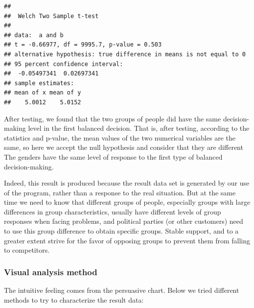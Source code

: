\documentclass[
]{article}
\newenvironment{Shaded}{\begin{snugshade}}{\end{snugshade}}
\newcommand{\KeywordTok}[1]{\textcolor[rgb]{0.13,0.29,0.53}{\textbf{#1}}}
\newcommand{\NormalTok}[1]{#1}
\newcommand{\OperatorTok}[1]{\textcolor[rgb]{0.81,0.36,0.00}{\textbf{#1}}}
\newcommand{\StringTok}[1]{\textcolor[rgb]{0.31,0.60,0.02}{#1}}
\begin{document}
\begin{Shaded}
\end{Shaded}

\begin{verbatim}
## 
##  Welch Two Sample t-test
## 
## data:  a and b
## t = -0.66977, df = 9995.7, p-value = 0.503
## alternative hypothesis: true difference in means is not equal to 0
## 95 percent confidence interval:
##  -0.05497341  0.02697341
## sample estimates:
## mean of x mean of y 
##    5.0012    5.0152
\end{verbatim}

After testing, we found that the two groups of people did have the same
decision-making level in the first balanced decision. That is, after
testing, according to the statistics and p-value, the mean values of the
two numerical variables are the same, so here we accept the null
hypothesis and consider that they are different The genders have the
same level of response to the first type of balanced decision-making.

Indeed, this result is produced because the result data set is generated
by our use of the program, rather than a response to the real situation.
But at the same time we need to know that different groups of people,
especially groups with large differences in group characteristics,
usually have different levels of group responses when facing problems,
and political parties (or other customers) need to use this group
difference to obtain specific groups. Stable support, and to a greater
extent strive for the favor of opposing groups to prevent them from
falling to competitors.

\hypertarget{visual-analysis-method}{%
\subsubsection{Visual analysis method}\label{visual-analysis-method}}

The intuitive feeling comes from the persuasive chart. Below we tried
different methods to try to characterize the result data:
\end{document}
